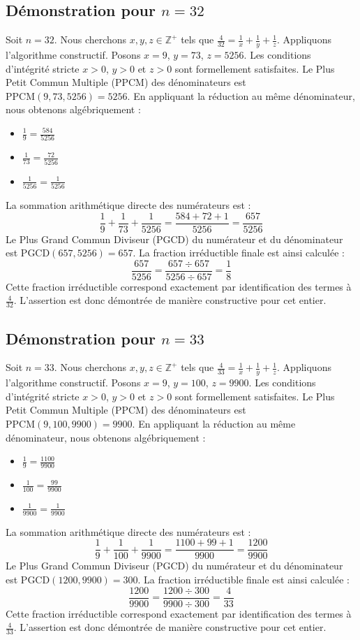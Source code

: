 \documentclass[11pt,a4paper]{article}
\begin{document}
\subsection{Démonstration pour $n = 32$}
Soit $n = 32$. Nous cherchons $x, y, z \in \mathbb{Z}^{+}$ tels que $\frac{4}{32} = \frac{1}{x} + \frac{1}{y} + \frac{1}{z}$.
Appliquons l'algorithme constructif. Posons $x = 9$, $y = 73$, $z = 5256$.
Les conditions d'intégrité stricte $x > 0$, $y > 0$ et $z > 0$ sont formellement satisfaites.
Le Plus Petit Commun Multiple (PPCM) des dénominateurs est $\text{PPCM}(9, 73, 5256) = 5256$.
En appliquant la réduction au même dénominateur, nous obtenons algébriquement :
\begin{itemize}
    \item $\frac{1}{9} = \frac{584}{5256}$
    \item $\frac{1}{73} = \frac{72}{5256}$
    \item $\frac{1}{5256} = \frac{1}{5256}$
\end{itemize}
La sommation arithmétique directe des numérateurs est :
$$ \frac{1}{9} + \frac{1}{73} + \frac{1}{5256} = \frac{584 + 72 + 1}{5256} = \frac{657}{5256} $$
Le Plus Grand Commun Diviseur (PGCD) du numérateur et du dénominateur est $\text{PGCD}(657, 5256) = 657$.
La fraction irréductible finale est ainsi calculée :
$$ \frac{657}{5256} = \frac{657 \div 657}{5256 \div 657} = \frac{1}{8} $$
Cette fraction irréductible correspond exactement par identification des termes à $\frac{4}{32}$. L'assertion est donc démontrée de manière constructive pour cet entier.

\subsection{Démonstration pour $n = 33$}
Soit $n = 33$. Nous cherchons $x, y, z \in \mathbb{Z}^{+}$ tels que $\frac{4}{33} = \frac{1}{x} + \frac{1}{y} + \frac{1}{z}$.
Appliquons l'algorithme constructif. Posons $x = 9$, $y = 100$, $z = 9900$.
Les conditions d'intégrité stricte $x > 0$, $y > 0$ et $z > 0$ sont formellement satisfaites.
Le Plus Petit Commun Multiple (PPCM) des dénominateurs est $\text{PPCM}(9, 100, 9900) = 9900$.
En appliquant la réduction au même dénominateur, nous obtenons algébriquement :
\begin{itemize}
    \item $\frac{1}{9} = \frac{1100}{9900}$
    \item $\frac{1}{100} = \frac{99}{9900}$
    \item $\frac{1}{9900} = \frac{1}{9900}$
\end{itemize}
La sommation arithmétique directe des numérateurs est :
$$ \frac{1}{9} + \frac{1}{100} + \frac{1}{9900} = \frac{1100 + 99 + 1}{9900} = \frac{1200}{9900} $$
Le Plus Grand Commun Diviseur (PGCD) du numérateur et du dénominateur est $\text{PGCD}(1200, 9900) = 300$.
La fraction irréductible finale est ainsi calculée :
$$ \frac{1200}{9900} = \frac{1200 \div 300}{9900 \div 300} = \frac{4}{33} $$
Cette fraction irréductible correspond exactement par identification des termes à $\frac{4}{33}$. L'assertion est donc démontrée de manière constructive pour cet entier.
\end{document}
